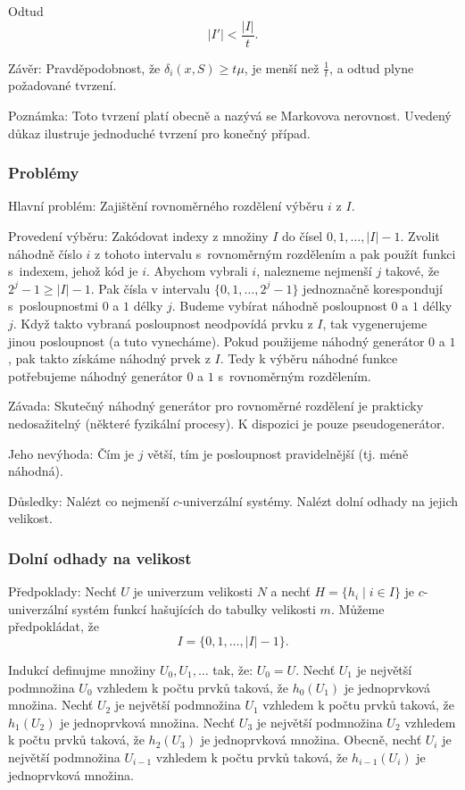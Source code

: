 \documentclass[a4paper,12pt]{article}
\begin{document}
Odtud
$$|I'|<\frac {|I|}t.$$

Závěr: Pravděpodobnost, že $\delta_i(x,S)\ge 
t\mu$, je menší 
než $\frac 1t$, a odtud plyne požadované tvrzení. 

Poznámka: Toto tvrzení platí obecně a nazývá 
se Markovova nerovnost. Uvedený důkaz 
ilustruje jednoduché tvrzení pro ko\-neč\-ný případ.

\subsubsection{Problémy}

Hlavní problém: Zajištění rovnoměrného rozdělení 
výběru $i$ z $I$.

Provedení výběru: Zakódovat indexy z množiny $
I$ do 
čísel $0,1,\dots,|I|-1$. Zvolit náhodně číslo $
i$ z tohoto 
intervalu s~rovnoměrným rozdělením a pak použít 
funkci s~indexem, jehož kód je $i$. Abychom vybrali $i$, nalezneme 
nejmenší $j$ takové, že $2^j-1\ge |I|-1$. Pak čísla v 
intervalu $\{0,1,\dots,2^j-1\}$ jednoznačně korespondují s~posloupnostmi $0$ a $1$ délky $j$. Budeme vybírat náhodně 
posloupnost $0$ a $1$ délky $j$. Když takto vybraná posloupnost neodpovídá prvku z $I$, tak vygenerujeme jinou posloupnost (a tuto vynecháme). Pokud použijeme náhodný generátor $0$ a $1$, pak takto získáme náhodný prvek z $I$. Tedy k výběru náhodné funkce potřebujeme  
náhodný generátor $0$ a $1$ s~rovnoměrným rozděle\-ním.

Závada: Skutečný náhodný generátor pro 
rovnoměrné rozděle\-ní je prakticky nedosažitelný 
(některé fyzikální procesy). K dispozici je pouze 
pseudogenerátor. 

Jeho nevýhoda: Čím je $j$ větší, tím je 
posloupnost pravidelnější (tj. méně náhodná). 

Důsledky: Nalézt co nejmenší $c$-univerzální 
systémy. Nalézt dolní odhady na jejich velikost.

\subsubsection{Dolní odhady na velikost}

Předpoklady: Nechť $U$ je univerzum velikosti $N$ a nechť 
$H=\{h_i\mid i\in I\}$ je $c$-univerzální systém funkcí hašujících do tabulky velikosti 
$m$. Můžeme předpoklá\-dat, že 
$$I=\{0,1,\dots,|I|-1\}.$$

Indukcí definujme množiny $U_0,U_1,\dots$ tak, že: 
$U_0=U$.\newline 
Nechť $U_1$ je největší podmnožina $U_0$ vzhledem k počtu 
prvků taková, že $h_0(U_1)$ je jednoprvková 
množina. \newline 
Nechť $U_2$ je největší podmnožina $U_1$ vzhledem k počtu 
prvků taková, že $h_1(U_2)$ je jednoprvková 
množina. \newline 
Nechť $U_3$ je největší podmnožina $U_2$ vzhledem k počtu 
prvků taková, že $h_2(U_3)$ je jednoprvková 
množina. \newline 
Obecně, nechť $U_i$ je největší podmnožina $U_{
i-1}$ vzhledem k počtu 
prvků taková, že $h_{i-1}(U_i)$ je jednoprvková 
množina. 
\end{document}

